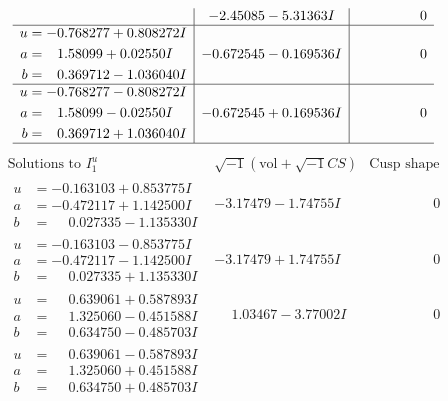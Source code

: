 \documentclass[1p]{elsarticle_modified}
\theoremstyle{definition}
\newcommand{\I}{\sqrt{-1}}
\begin{document}
$$\begin{array}{c|c|c}
 & -2.45085 - 5.31363 I & \phantom{-0.000000 } 0 \\ \hline\begin{aligned}
u &= -0.768277 + 0.808272 I \\
a &= \phantom{-}1.58099 + 0.02550 I \\
b &= \phantom{-}0.369712 - 1.036040 I\end{aligned}
 & -0.672545 - 0.169536 I & \phantom{-0.000000 } 0 \\ \hline\begin{aligned}
u &= -0.768277 - 0.808272 I \\
a &= \phantom{-}1.58099 - 0.02550 I \\
b &= \phantom{-}0.369712 + 1.036040 I\end{aligned}
 & -0.672545 + 0.169536 I & \phantom{-0.000000 } 0\\
 \hline 
 \end{array}$$\newpage$$\begin{array}{c|c|c}  
\text{Solutions to }I^u_{1}& \I (\text{vol} + \sqrt{-1}CS) & \text{Cusp shape}\\
 \hline 
\begin{aligned}
u &= -0.163103 + 0.853775 I \\
a &= -0.472117 + 1.142500 I \\
b &= \phantom{-}0.027335 - 1.135330 I\end{aligned}
 & -3.17479 - 1.74755 I & \phantom{-0.000000 } 0 \\ \hline\begin{aligned}
u &= -0.163103 - 0.853775 I \\
a &= -0.472117 - 1.142500 I \\
b &= \phantom{-}0.027335 + 1.135330 I\end{aligned}
 & -3.17479 + 1.74755 I & \phantom{-0.000000 } 0 \\ \hline\begin{aligned}
u &= \phantom{-}0.639061 + 0.587893 I \\
a &= \phantom{-}1.325060 - 0.451588 I \\
b &= \phantom{-}0.634750 - 0.485703 I\end{aligned}
 & \phantom{-}1.03467 - 3.77002 I & \phantom{-0.000000 } 0 \\ \hline\begin{aligned}
u &= \phantom{-}0.639061 - 0.587893 I \\
a &= \phantom{-}1.325060 + 0.451588 I \\
b &= \phantom{-}0.634750 + 0.485703 I\end{aligned}

\end{array}$$
\end{document}
